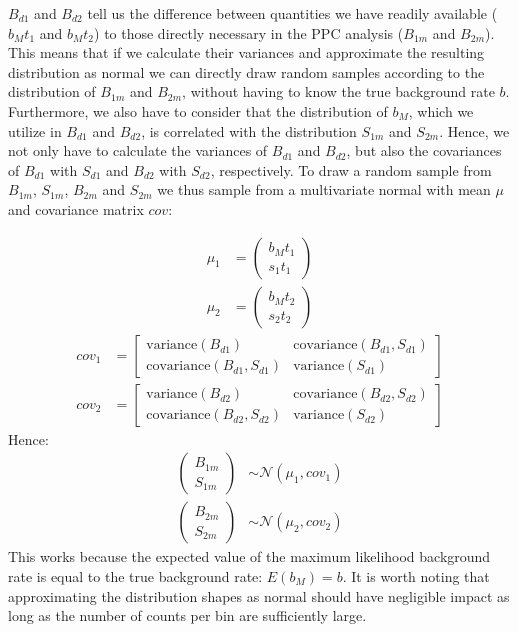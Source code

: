 \documentclass{report}
\begin{document}
$B_{d1}$ and $B_{d2}$ tell us the difference between quantities we have readily available ($b_Mt_1$ and $b_Mt_2$) to those directly necessary in the PPC analysis ($B_{1m}$ and $B_{2m}$). This means that if we calculate their variances and approximate the resulting distribution as normal we can directly draw random samples according to the distribution of $B_{1m}$ and $B_{2m}$, without having to know the true background rate $b$. Furthermore, we also have to consider that the distribution of $b_M$, which we utilize in $B_{d1}$ and $B_{d2}$, is correlated with the distribution $S_{1m}$ and $S_{2m}$. Hence, we not only have to calculate the variances of $B_{d1}$ and $B_{d2}$, but also the covariances of $B_{d1}$ with $S_{d1}$ and $B_{d2}$ with $S_{d2}$, respectively. To draw a random sample from $B_{1m}$, $S_{1m}$, $B_{2m}$ and $S_{2m}$ we thus sample from a multivariate normal with mean $\mu$ and covariance matrix $cov$:

\begin{align}
    \mu_1 &= \begin{pmatrix}
        b_Mt_1 \\ s_1t_1
    \end{pmatrix} \\
    \mu_2 &= \begin{pmatrix}
      b_Mt_2 \\ s_2t_2
  \end{pmatrix} 
\end{align}
\begin{align} \label{eq: covs mats}
    cov_1 &= \begin{bmatrix}
        \text{variance}(B_{d1}) & \text{covariance}(B_{d1}, S_{d1})\\ \text{covariance}(B_{d1}, S_{d1}) & \text{variance}(S_{d1})
    \end{bmatrix} \\
    cov_2 &= \begin{bmatrix}
      \text{variance}(B_{d2}) & \text{covariance}(B_{d2}, S_{d2})\\ \text{covariance}(B_{d2}, S_{d2}) & \text{variance}(S_{d2})
  \end{bmatrix}
\end{align}
Hence: 
\begin{align} \label{eq mult var norm ppc}
    \begin{pmatrix}
        B_{1m} \\ S_{1m}
    \end{pmatrix}
    &\sim \mathcal{N}(\mu_1, cov_1)\\
    \begin{pmatrix}
      B_{2m} \\ S_{2m}
  \end{pmatrix}
  &\sim \mathcal{N}(\mu_2, cov_2)
\end{align}
This works because the expected value of the maximum likelihood background rate is equal to the true background rate: $E(b_M) = b$. It is worth noting that approximating the distribution shapes as normal should have negligible impact as long as the number of counts per bin are sufficiently large.
\end{document}
